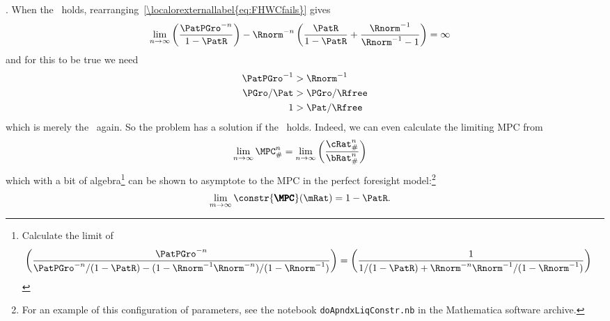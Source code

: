\documentclass[\econtexRoot/BufferStockTheory]{subfiles}
\begin{document}
.  When the \RIC~holds, rearranging~\eqref{\localorexternallabel{eq:FHWCfails}} gives
\begin{eqnarray*}
  \lim_{n \rightarrow \infty} \left(\frac{\PatPGro^{-n}}{1-\PatR}\right)-\Rnorm^{-n}\left(\frac{\PatR}{1-\PatR}+\frac{\Rnorm^{-1}}{\Rnorm^{-1}-1}\right)  & = \infty
\end{eqnarray*}
and for this to be true we need
\begin{eqnarray*}
  \PatPGro^{-1}  & > \Rnorm^{-1}
  \\ \PGro/\Pat  & > \PGro/\Rfree
  \\ 1  & > \Pat/\Rfree
\end{eqnarray*}
which is merely the \RIC~again.  So the problem has a solution if the \RIC~holds.  Indeed,
we can even calculate the limiting MPC from
\begin{equation}\begin{gathered}\begin{aligned}
  \lim_{n \rightarrow \infty} \MPC^{n}_{\#}  & = \lim_{n \rightarrow \infty} \left(\frac{\cRat_{\#}^{n}}{\bRat_{\#}^{n}}\right) \label{eq:MPCConstrLim}
\end{aligned}\end{gathered}\end{equation}
which with a bit of algebra\footnote{
  Calculate the limit of
  \begin{equation}\begin{gathered}\begin{aligned}
    \left(\frac{\PatPGro^{-n}}{\PatPGro^{-n}/(1-\PatR) - (1-\Rnorm^{-1}\Rnorm^{-n})/(1-\Rnorm^{-1})}\right)  & = \left(\frac{1}{1/(1-\PatR) + \Rnorm^{-n}\Rnorm^{-1}/(1-\Rnorm^{-1})}\right)
  \end{aligned}\end{gathered}\end{equation}} can be shown to asymptote to the MPC in the perfect foresight model:\footnote{For an example of this configuration of parameters, see the notebook \texttt{doApndxLiqConstr.nb} in the Mathematica software  archive.}
\begin{equation}\begin{gathered}\begin{aligned}
  \lim_{m \rightarrow \infty} \constr{\pmb{\MPC}}(\mRat)  & = 1-\PatR.
\end{aligned}\end{gathered}\end{equation}
\end{document}
